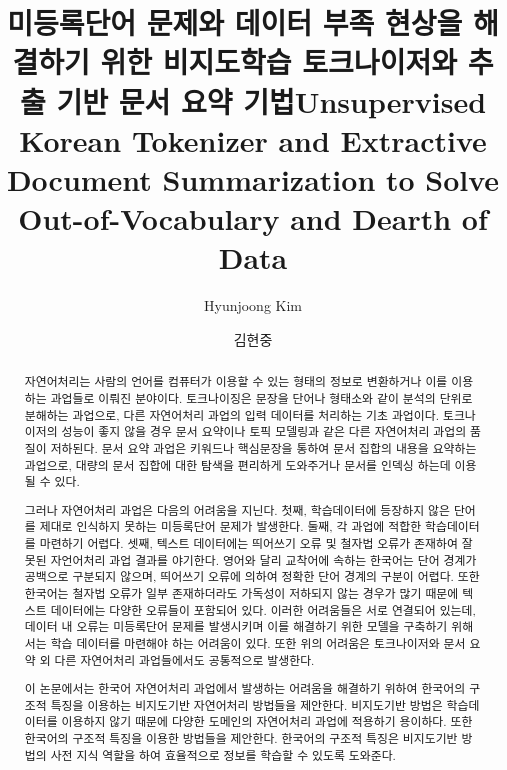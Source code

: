 \documentclass[oneside, ko,phd]{snuthesis_utf8_kor}
\title{미등록단어 문제와 데이터 부족 현상을 해결하기 위한 비지도학습 토크나이저와 추출 기반 문서 요약 기법}
\title*{Unsupervised Korean Tokenizer and Extractive Document Summarization to Solve Out-of-Vocabulary and Dearth of Data}
\author{Hyunjoong Kim}
\author*{김현중} %
\begin{document}
\makefrontcover
\makeapproval

\cleardoublepage
{}
\begin{abstract}
자연어처리는 사람의 언어를 컴퓨터가 이용할 수 있는 형태의 정보로 변환하거나 이를 이용하는 과업들로 이뤄진 분야이다.
토크나이징은 문장을 단어나 형태소와 같이 분석의 단위로 분해하는 과업으로, 다른 자연어처리 과업의 입력 데이터를 처리하는 기초 과업이다.
토크나이저의 성능이 좋지 않을 경우 문서 요약이나 토픽 모델링과 같은 다른 자연어처리 과업의 품질이 저하된다.
문서 요약 과업은 키워드나 핵심문장을 통하여 문서 집합의 내용을 요약하는 과업으로, 대량의 문서 집합에 대한 탐색을 편리하게 도와주거나 문서를 인덱싱 하는데 이용될 수 있다.

그러나 자연어처리 과업은 다음의 어려움을 지닌다.
첫째, 학습데이터에 등장하지 않은 단어를 제대로 인식하지 못하는 미등록단어 문제가 발생한다.
둘째, 각 과업에 적합한 학습데이터를 마련하기 어렵다.
셋째, 텍스트 데이터에는 띄어쓰기 오류 및 철자법 오류가 존재하여 잘못된 자언어처리 과업 결과를 야기한다.
영어와 달리 교착어에 속하는 한국어는 단어 경계가 공백으로 구분되지 않으며, 띄어쓰기 오류에 의하여 정확한 단어 경계의 구분이 어렵다.
또한 한국어는 철자법 오류가 일부 존재하더라도 가독성이 저하되지 않는 경우가 많기 때문에 텍스트 데이터에는 다양한 오류들이 포함되어 있다.
이러한 어려움들은 서로 연결되어 있는데, 데이터 내 오류는 미등록단어 문제를 발생시키며 이를 해결하기 위한 모델을 구축하기 위해서는 학습 데이터를 마련해야 하는 어려움이 있다.
또한 위의 어려움은 토크나이저와 문서 요약 외 다른 자연어처리 과업들에서도 공통적으로 발생한다.

이 논문에서는 한국어 자연어처리 과업에서 발생하는 어려움을 해결하기 위하여 한국어의 구조적 특징을 이용하는 비지도기반 자연어처리 방법들을 제안한다.
비지도기반 방법은 학습데이터를 이용하지 않기 때문에 다양한 도메인의 자연어처리 과업에 적용하기 용이하다.
또한 한국어의 구조적 특징을 이용한 방법들을 제안한다.
한국어의 구조적 특징은 비지도기반 방법의 사전 지식 역할을 하여 효율적으로 정보를 학습할 수 있도록 도와준다.


\end{abstract}
\end{document}
